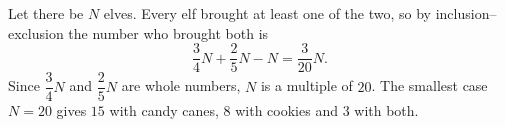 Let there be $N$ elves. Every elf brought at least one of the two, so by inclusion--exclusion the number who brought both is
\[
\dfrac{3}{4}N+\dfrac{2}{5}N-N=\dfrac{3}{20}N .
\]
Since $\dfrac{3}{4}N$ and $\dfrac{2}{5}N$ are whole numbers, $N$ is a multiple of $20$. The smallest case $N=20$ gives $15$ with candy canes, $8$ with cookies and $\boxed{3}$ with both.
